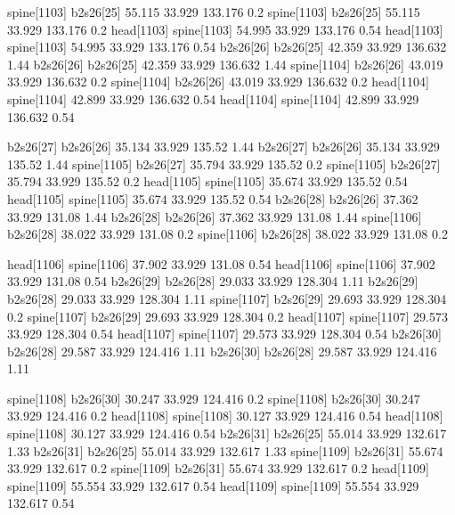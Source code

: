 spine[1103]    b2s26[25]    55.115    33.929    133.176    0.2
spine[1103]    b2s26[25]    55.115    33.929    133.176    0.2
head[1103]    spine[1103]    54.995    33.929    133.176    0.54
head[1103]    spine[1103]    54.995    33.929    133.176    0.54
b2s26[26]    b2s26[25]    42.359    33.929    136.632    1.44
b2s26[26]    b2s26[25]    42.359    33.929    136.632    1.44
spine[1104]    b2s26[26]    43.019    33.929    136.632    0.2
spine[1104]    b2s26[26]    43.019    33.929    136.632    0.2
head[1104]    spine[1104]    42.899    33.929    136.632    0.54
head[1104]    spine[1104]    42.899    33.929    136.632    0.54


b2s26[27]    b2s26[26]    35.134    33.929    135.52    1.44
b2s26[27]    b2s26[26]    35.134    33.929    135.52    1.44
spine[1105]    b2s26[27]    35.794    33.929    135.52    0.2
spine[1105]    b2s26[27]    35.794    33.929    135.52    0.2
head[1105]    spine[1105]    35.674    33.929    135.52    0.54
head[1105]    spine[1105]    35.674    33.929    135.52    0.54
b2s26[28]    b2s26[26]    37.362    33.929    131.08    1.44
b2s26[28]    b2s26[26]    37.362    33.929    131.08    1.44
spine[1106]    b2s26[28]    38.022    33.929    131.08    0.2
spine[1106]    b2s26[28]    38.022    33.929    131.08    0.2


head[1106]    spine[1106]    37.902    33.929    131.08    0.54
head[1106]    spine[1106]    37.902    33.929    131.08    0.54
b2s26[29]    b2s26[28]    29.033    33.929    128.304    1.11
b2s26[29]    b2s26[28]    29.033    33.929    128.304    1.11
spine[1107]    b2s26[29]    29.693    33.929    128.304    0.2
spine[1107]    b2s26[29]    29.693    33.929    128.304    0.2
head[1107]    spine[1107]    29.573    33.929    128.304    0.54
head[1107]    spine[1107]    29.573    33.929    128.304    0.54
b2s26[30]    b2s26[28]    29.587    33.929    124.416    1.11
b2s26[30]    b2s26[28]    29.587    33.929    124.416    1.11


spine[1108]    b2s26[30]    30.247    33.929    124.416    0.2
spine[1108]    b2s26[30]    30.247    33.929    124.416    0.2
head[1108]    spine[1108]    30.127    33.929    124.416    0.54
head[1108]    spine[1108]    30.127    33.929    124.416    0.54
b2s26[31]    b2s26[25]    55.014    33.929    132.617    1.33
b2s26[31]    b2s26[25]    55.014    33.929    132.617    1.33
spine[1109]    b2s26[31]    55.674    33.929    132.617    0.2
spine[1109]    b2s26[31]    55.674    33.929    132.617    0.2
head[1109]    spine[1109]    55.554    33.929    132.617    0.54
head[1109]    spine[1109]    55.554    33.929    132.617    0.54


